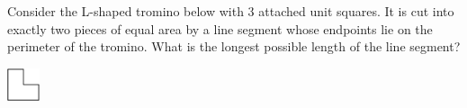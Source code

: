 Consider the L-shaped tromino below with 3 attached unit squares. It is cut into exactly two pieces of equal area by a line segment whose endpoints lie on the perimeter of the tromino. What is the longest possible length of the line segment?

\begin{center}
\includegraphics[width = 9.600000000000001mm]{img/fig0.png}
\end{center}

